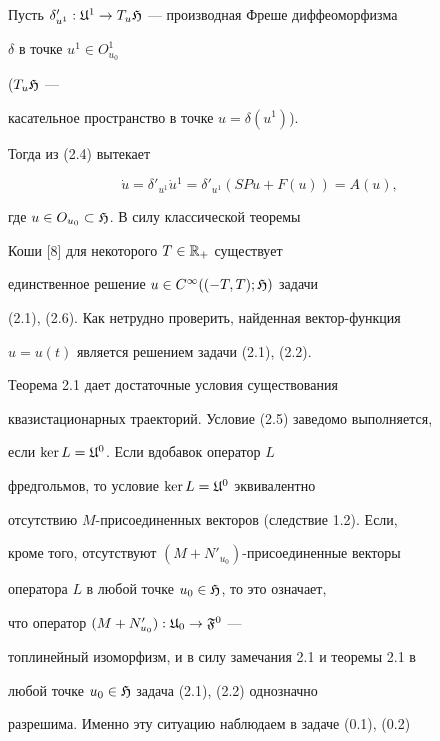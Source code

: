 \begin{pf}


Пусть $\delta'_{u^{1}}:\frak


U^{1}\rightarrow T_{u}\frak H$ --- производная Фреше диффеоморфизма


$\delta$ в точке $u^{1}\in O^{1}_{u_{0}}$


($T_{u}\frak H$ ---


касательное пространство  в точке $u=\delta(u^{1})$).


Тогда из (2.4) вытекает


\begin{equation}


\Dot{u}=\delta'_{u^{1}}\Dot u{}^{1}=\delta'_{u^{1}}(SPu+F(u))=A(u),


\end{equation}


где $u\in O_{u_{0}}\subset\frak H$. В силу классической теоремы


Коши [8] для некоторого  $T\in\Bbb R_{+}$ существует


единственное решение $u\in C^{\infty}((-T,T);\frak H)$ задачи


(2.1), (2.6). Как нетрудно проверить, найденная вектор-функция


$u=u(t)$ является решением задачи (2.1), (2.2).


\end{pf}





Теорема 2.1 дает достаточные условия существования


квазистационарных траекторий. Условие (2.5) заведомо выполняется,


если $\ker L=\frak U^{0}$. Если вдобавок оператор $L$


фредгольмов, то условие $\ker L=\frak U^{0}$ эквивалентно


отсутствию $M$-присоединенных векторов (следствие 1.2). Если,


кроме того, отсутствуют $(M+N'_{u_{0}})$-присоединенные векторы


оператора $L$ в любой точке $u_{0}\in\frak H$, то это означает,


что оператор $(M+N'_{u_{0}}):\frak U_{0}\rightarrow\frak F^{0}$ ---


топлинейный изоморфизм, и в силу замечания 2.1 и теоремы 2.1 в


любой точке $u_{0}\in\frak H$ задача (2.1), (2.2) однозначно


разрешима. Именно эту ситуацию наблюдаем в задаче (0.1), (0.2)


